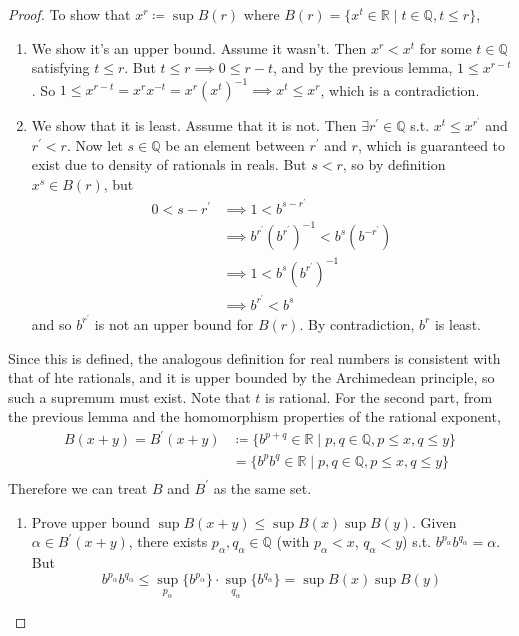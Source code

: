     \begin{proof}
      To show that $x^r \coloneqq \sup B(r)$ where $B(r) = \{x^t \in \mathbb{R} \mid t \in \mathbb{Q}, t \leq r \}$, 
      \begin{enumerate}
        \item We show it's an upper bound. Assume it wasn't. Then $x^r < x^t$ for some $t \in \mathbb{Q}$ satisfying $t \leq r$. But $t \leq r \implies 0 \leq r - t$, and by the previous lemma, $1 \leq x^{r - t}$. So $1 \leq x^{r-t} = x^{r} x^{-t} = x^r (x^t)^{-1} \implies x^t \leq x^r$, which is a contradiction. 
        \item We show that it is least. Assume that it is not. Then $\exists r^\prime \in \mathbb{Q}$ s.t. $x^t \leq x^{r^\prime}$ and $r^\prime < r$. Now let $s \in \mathbb{Q}$ be an element between $r^\prime$ and $r$, which is guaranteed to exist due to density of rationals in reals. But $s < r$, so by definition $x^s \in B(r)$, but 
        \begin{align}
          0 < s - r^\prime & \implies 1 < b^{s - r^\prime} \\
                           & \implies b^{r^\prime} (b^{r^\prime})^{-1} < b^s (b^{-r^\prime}) \\
                           & \implies 1 < b^s (b^{r^\prime})^{-1} \\
                           & \implies b^{r^\prime} < b^s
        \end{align}
        and so $b^{r^\prime}$ is not an upper bound for $B(r)$. By contradiction, $b^r$ is least. 
      \end{enumerate}
      Since this is defined, the analogous definition for real numbers is consistent with that of hte rationals, and it is upper bounded by the Archimedean principle, so such a supremum must exist. Note that $t$ is rational. For the second part, from the previous lemma and the homomorphism properties of the rational exponent, 
      \begin{align}
        B(x + y) = B^\prime (x + y) & \coloneqq \{b^{p+q} \in \mathbb{R} \mid p, q \in \mathbb{Q}, p \leq x, q \leq y\} \\
                                    & = \{b^p b^q \in \mathbb{R} \mid p, q \in \mathbb{Q}, p \leq x, q \leq y\} \\
      \end{align}
      Therefore we can treat $B$ and $B^\prime$ as the same set. 
      \begin{enumerate}
        \item Prove upper bound $\sup{B(x + y)} \leq \sup{B(x)} \sup{B(y)}$. Given $\alpha \in B^\prime (x + y)$, there exists $p_\alpha, q_{\alpha} \in \mathbb{Q}$ (with $p_\alpha < x$, $q_\alpha < y$) s.t. $b^{p_{\alpha}} b^{q_{\alpha}} = \alpha$. But 
        \begin{equation}
          b^{p_{\alpha}} b^{q_{\alpha}} \leq \sup_{p_{\alpha}} \{ b^{p_{\alpha}}\} \cdot \sup_{q_{\alpha}} \{b^{q_{\alpha}}\} = \sup{B(x)} \sup{B(y)}
        \end{equation}


\end{enumerate}
\end{proof}
